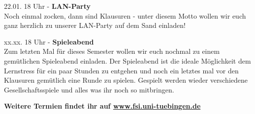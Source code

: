 \large 22.01. 18 Uhr - \textbf{LAN-Party}\\
\normalsize
Noch einmal zocken, dann sind Klausuren - unter diesem Motto wollen wir euch ganz herzlich zu unserer LAN-Party auf dem Sand einladen!\\

\large xx.xx. 18 Uhr - \textbf{Spieleabend}\\
\normalsize
Zum letzten Mal für dieses Semester wollen wir euch nochmal zu einem gemütlichen Spieleabend einladen. Der Spieleabend ist die ideale Möglichkeit dem Lernstress für ein paar Stunden zu entgehen und noch ein letztes mal vor den Klausuren gemütlich eine Runde zu spielen. Gespielt werden wieder verschiedene Gesellschaftsspiele und alles was ihr noch so mitbringen.

\centering \large \textbf{Weitere Termien findet ihr auf \url{www.fsi.uni-tuebingen.de}}

\vfill
\begin{center}
\end{center}